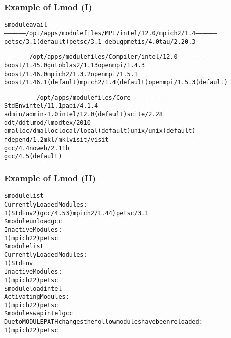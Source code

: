 \documentclass{beamer}
\begin{document}
\begin{frame}[fragile]
    \frametitle{Example of Lmod (I)}
    {\tiny
\begin{alltt}
\$ {\color{blue} module avail}
------------------ /opt/apps/modulefiles/MPI/intel/12.0/mpich2/1.4 ------------------
  petsc/3.1 (default)    petsc/3.1-debug    pmetis/4.0    tau/2.20.3

------------------- /opt/apps/modulefiles/Compiler/intel/12.0 -----------------------
  boost/1.45.0              gotoblas2/1.13          openmpi/1.4.3
  boost/1.46.0              mpich2/1.3.2            openmpi/1.5.1
  boost/1.46.1 (default)    mpich2/1.4 (default)    openmpi/1.5.3 (default)

-------------------------- /opt/apps/modulefiles/Core -------------------------------
  StdEnv               intel/11.1               papi/4.1.4
  admin/admin-1.0      intel/12.0 (default)     scite/2.28
  ddt/ddt              lmod/lmod                tex/2010
  dmalloc/dmalloc      local/local (default)    unix/unix (default)
  fdepend/1.2          mkl/mkl                  visit/visit
  gcc/4.4              noweb/2.11b
  gcc/4.5 (default)
\end{alltt}
    }
\end{frame}

\begin{frame}[fragile]
    \frametitle{Example of Lmod (II)}
    {\tiny
\begin{alltt}
{\color{blue}\$ module list}
Currently Loaded Modules:
  1) StdEnv  2) gcc/4.5  3) mpich2/1.4  4) petsc/3.1
{\color{blue}\$ module unload gcc}
Inactive Modules:
  1) mpich2  2) petsc
{\color{blue}\$ module list}
Currently Loaded Modules:
  1) StdEnv
Inactive Modules:
  1) mpich2  2) petsc
{\color{blue}\$ module load intel}
Activating Modules:
  1) mpich2  2) petsc
{\color{blue}\$ module swap intel gcc}
Due to MODULEPATH changes the follow modules have been reloaded:
  1) mpich2  2) petsc
\end{alltt}
    }
\end{frame}
\end{document}

